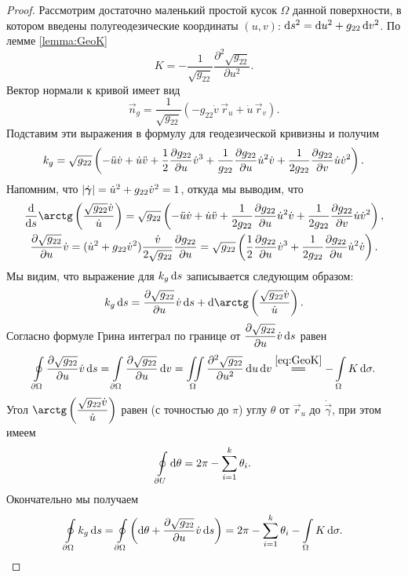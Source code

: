 \begin{proof}
	Рассмотрим достаточно маленький простой кусок $\Omega$ данной поверхности, в котором введены полугеодезические координаты $(u, v)$: $\mathop{}\!\mathrm{d} s^2 = \mathop{}\!\mathrm{d} u^2 + g_{22}\mathop{}\!\mathrm{d} v^2$. По лемме \ref{lemma:GeoK}
	\[
		K = -\frac{1}{\sqrt{g_{22}}}\frac{\partial^2\sqrt{g_{22}}}{\partial u^2}.
	\]
	Вектор нормали к кривой имеет вид
	\[
		\vec{n}_g = \frac{1}{\sqrt{g_{22}}}(-g_{22}\dot{v}\,\vec{r}_u + \dot{u}\,\vec{r}_v).
	\]
	Подставим эти выражения в формулу для геодезической кривизны и получим
	\[
		k_g = \sqrt{g_{22}}\left(-\ddot{u}\dot{v} + \dot{u}\ddot{v} + \frac{1}{2}\frac{\partial g_{22}}{\partial u}\dot{v}^3 + \frac{1}{g_{22}}\frac{\partial g_{22}}{\partial u}\dot{u}^2\dot{v} + \frac{1}{2g_{22}}\frac{\partial g_{22}}{\partial v}\dot{u}\dot{v}^2\right).
	\]
	Напомним, что $\left\lvert\dot{\boldsymbol{\gamma}}\right\rvert = \dot{u}^2 + g_{22}\dot{v}^2 = 1$, откуда мы выводим, что
	\begin{gather*}
		\frac{\d}{\d s}\arctg\br{\frac{\sqrt{g_{22}}\dot{v}}{\dot{u}}} = \sqrt{g_{22}}\br{-\ddot{u}\dot{v} + \dot{u}\ddot{v} + \frac{1}{2g_{22}}\frac{\partial g_{22}}{\partial u}\dot{u}^2\dot{v} + \frac{1}{2g_{22}}\frac{\partial g_{22}}{\partial v}\dot{u}\dot{v}^2},\\
		\frac{\partial\sqrt{g_{22}}}{\partial u}\dot{v} = (\dot{u}^2 + g_{22}\dot{v}^2)\frac{\dot{v}}{2\sqrt{g_{22}}}\frac{\partial g_{22}}{\partial u} = \sqrt{g_{22}}\br{\frac{1}{2}\frac{\partial g_{22}}{\partial u}\dot{v}^3 + \frac{1}{2g_{22}}\frac{\partial g_{22}}{\partial u}\dot{u}^2\dot{v}}.
	\end{gather*}
	Мы видим, что выражение для $k_g\mathop{}\!\mathrm{d} s$ записывается следующим образом:
	\[
		k_g\d s = \frac{\partial\sqrt{g_{22}}}{\partial u}\dot{v}\d s + \d\arctg\br{\frac{\sqrt{g_{22}}\dot{v}}{\dot{u}}}.
	\]
	Согласно формуле Грина интеграл по границе от $\displaystyle\frac{\partial\sqrt{g_{22}}}{\partial u}\dot{v}\mathop{}\!\mathrm{d} s$ равен
	\[
		\oint\limits_{\partial \Omega}\frac{\partial\sqrt{g_{22}}}{\partial u}\dot{v}\d s = \int\limits_{\partial \Omega}\frac{\partial\sqrt{g_{22}}}{\partial u}\d v = \iint\limits_{\Omega}\frac{\partial^2\sqrt{g_{22}}}{\partial u^2}\d u\d v \stackrel{\eqref{eq:GeoK}}{=\joinrel=} -\int\limits_{\Omega}K\d\sigma.
	\]
	Угол $\ds\arctg\br{\frac{\sqrt{g_{22}}\dot{v}}{\dot{u}}}$ равен (с точностью до $\pi$) углу $\theta$ от $\vec{r}_u$ до $\dot{\vec{\gamma}}$, при этом имеем
	\[
		\oint\limits_{\partial U}\mathop{}\!\mathrm{d}\theta = 2\pi - \sum_{i = 1}^k\theta_i.
	\]
	Окончательно мы получаем
	\[
		\oint\limits_{\partial \Omega}k_g\mathop{}\!\mathrm{d} s = \oint\limits_{\partial \Omega}\left(\mathop{}\!\mathrm{d}\theta + \frac{\partial\sqrt{g_{22}}}{\partial u}\dot{v}\mathop{}\!\mathrm{d} s\right) = 2\pi - \sum_{i = 1}^k\theta_i - \int\limits_{\Omega}K\mathop{}\!\mathrm{d}\sigma.
	\]
	

\end{proof}
